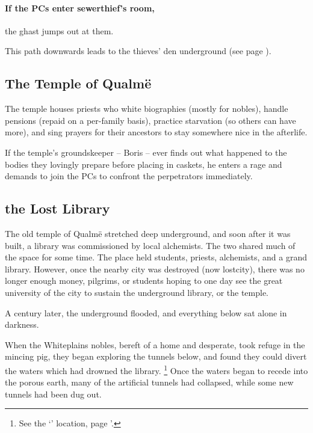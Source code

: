 \begin{multicols}{2}
\paragraph{If the PCs enter \gls{sewerthief}'s room,}
the ghast jumps out at them.

\ghast

This path downwards leads to the thieves' den underground (see page \pageref{sewerPigWalk}).

\subsection{The Temple of Qualm\"e}

The temple houses priests who white biographies (mostly for nobles), handle pensions (repaid on a per-family basis), practice starvation (so others can have more), and sing prayers for their ancestors to stay somewhere nice in the afterlife.

If the temple's groundskeeper -- Boris -- ever finds out what happened to the bodies they lovingly prepare before placing in caskets, he enters a rage and demands to join the PCs to confront the perpetrators immediately.


\subsection{the Lost Library}\label{sewers}\setcounter{list}{0}

The old temple of Qualm\"{e} stretched deep underground, and soon after it was built, a library was commissioned by local alchemists.
The two shared much of the space for some time.
The place held students, priests, alchemists, and a grand library.
However, once the nearby city was destroyed (now \gls{lostcity}), there was no longer enough money, pilgrims, or students hoping to one day see the great university of the city to sustain the underground library, or the temple.

A century later, the underground flooded, and everything below sat alone in darkness.

When the Whiteplains nobles, bereft of a home and desperate, took refuge in the mincing pig, they began exploring the tunnels below, and found they could divert the waters which had drowned the library.%
\footnote{See the `' location, page \pageref{runoff}'.}
Once the waters began to recede into the porous earth, many of the artificial tunnels had collapsed, while some new tunnels had been dug out.


\end{multicols}
